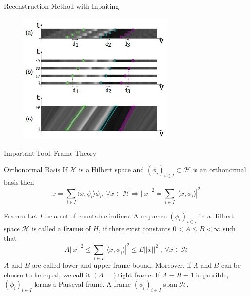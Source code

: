 \begin{frame}{Reconstruction Method with Inpaiting}
\begin{block}{}
\begin{figure}[h!]
\includegraphics[width=0.7\textwidth]{./../../Diagrams/sparse_EPI.jpg}
\end{figure}
\end{block}
\end{frame}

\begin{frame}{Important Tool: Frame Theory}

\begin{block}{Orthonormal Basis}
If $\mathcal{H}$ is a Hilbert space and $(\phi_i)_{i\in I}\subset \mathcal{H}$ is an orthonormal basis then 
$$
x = \sum_{i\in I}\langle x,\phi_i\rangle \phi_i\text{,  }\forall x\in\mathcal{H}
\Longrightarrow
||x||^2=\sum_{i\in I}|\langle x,\phi_i\rangle|^2
$$
\end{block}

\begin{block}{Frames}
Let $I$ be a set of countable indices. A sequence $(\phi_i)_{i\in I}$ in a Hilbert space $\mathcal{H}$ is called a \textbf{frame} of $H$, if there exist constants $0< A\leq B<\infty$ such that
$$
A||x||^2\leq\sum_{i\in I}|\langle x,\phi_i\rangle|^2\leq B||x||^2 \text{  ,  } \forall x\in\mathcal{H}
$$
$A$ and $B$ are called lower and upper frame bound. Moreover, if $A$ and $B$ can be chosen to be equal, we call it $(A-)$tight frame. If $A=B=1$ is possible, $(\phi_i)_{i\in I}$ forms a Parseval frame. A frame $(\phi_i)_{i\in I}$ span $\mathcal{H}$. 
\end{block}
\end{frame}

